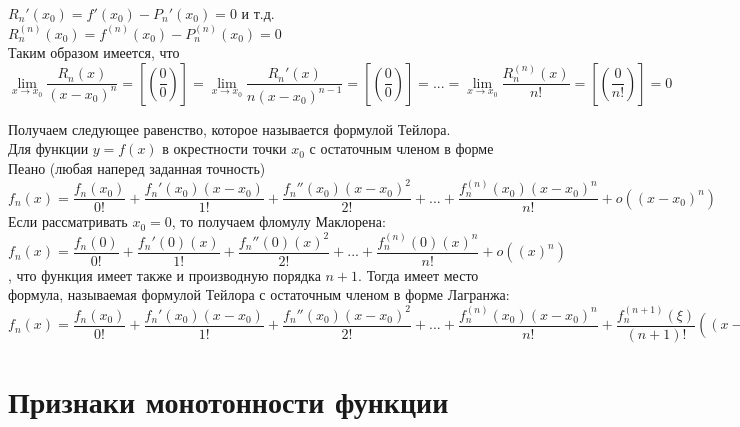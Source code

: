 \documentclass[oneside]{book}
\begin{document}
\begin{enumerate}
\begin{itemize}
\begin{enumerate}
$R_n'(x_0)=f'(x_0)-P_n'(x_0)=0$ и т.д.\\
$R_n^{(n)}(x_0)=f^{(n)}(x_0)-P_n^{(n)}(x_0)=0$\\
Таким образом имеется, что
$\lim \limits_{x \rightarrow x_0}\dfrac{R_n(x)}{(x-x_0)^n}=[(\dfrac{0}{0})]=\lim \limits_{x \rightarrow x_0}\dfrac{R_n'(x)}{n(x-x_0)^{n-1}}=[(\dfrac{0}{0})]=...=\lim \limits_{x \rightarrow x_0}\dfrac{R_n^{(n)}(x)}{n!}=[(\dfrac{0}{n!})]=0$
\par Получаем следующее равенство, которое называется формулой Тейлора.\\
Для функции $y=f(x)$ в окрестности точки $x_0$ с остаточным членом в форме Пеано (любая наперед заданная точность)
\\$f_n(x)=\dfrac{f_n(x_0)}{0!}+\dfrac{f_n'(x_0)(x-x_0)}{1!}+\dfrac{f_n''(x_0)(x-x_0)^2}{2!}+...+\dfrac{f_n^{(n)}(x_0)(x-x_0)^n}{n!}+o((x-x_0)^n)$\\
Если рассматривать $x_0=0$, то получаем фломулу Маклорена:\\
$f_n(x)=\dfrac{f_n(0)}{0!}+\dfrac{f_n'(0)(x)}{1!}+\dfrac{f_n''(0)(x)^2}{2!}+...+\dfrac{f_n^{(n)}(0)(x)^n}{n!}+o((x)^n)$
, что функция имеет также и производную порядка $n+1$. Тогда имеет место формула, называемая формулой Тейлора с остаточным членом в форме Лагранжа:\\
$f_n(x)=\dfrac{f_n(x_0)}{0!}+\dfrac{f_n'(x_0)(x-x_0)}{1!}+\dfrac{f_n''(x_0)(x-x_0)^2}{2!}+...+\dfrac{f_n^{(n)}(x_0)(x-x_0)^n}{n!}+\dfrac{f_n^{(n+1)}(\xi)}{(n+1)!}((x-x_0)^{n+1}),\xi \in (x_0;x)$
\setcounter{chapter}{26}         
\chapter{Признаки монотонности функции\\}         


\end{enumerate}
\end{itemize}
\end{enumerate}
\end{document}
